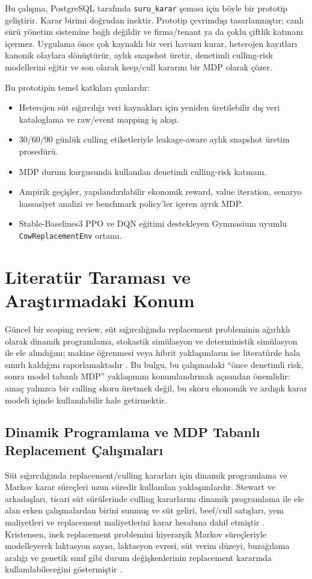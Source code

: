 \documentclass[conference]{IEEEtran}
\begin{document}
Bu çalışma, PostgreSQL tarafında \texttt{suru\_karar} şeması için böyle bir
prototip geliştirir. Karar birimi doğrudan inektir. Prototip çevrimdışı
tasarlanmıştır; canlı sürü yönetim sistemine bağlı değildir ve firma/tenant ya
da çoklu çiftlik katmanı içermez. Uygulama önce çok kaynaklı bir veri havuzu
kurar, heterojen kayıtları kanonik olaylara dönüştürür, aylık snapshot üretir,
denetimli culling-risk modellerini eğitir ve son olarak keep/cull kararını bir
MDP olarak çözer.

Bu prototipin temel katkıları şunlardır:
\begin{itemize}
    \item Heterojen süt sığırcılığı veri kaynakları için yeniden üretilebilir
    dış veri kataloglama ve raw/event mapping iş akışı.
    \item 30/60/90 günlük culling etiketleriyle leakage-aware aylık snapshot
    üretim prosedürü.
    \item MDP durum kurgusunda kullanılan denetimli culling-risk katmanı.
    \item Ampirik geçişler, yapılandırılabilir ekonomik reward, value iteration,
    senaryo hassasiyet analizi ve benchmark policy'ler içeren ayrık MDP.
    \item Stable-Baselines3 PPO ve DQN eğitimi destekleyen Gymnasium uyumlu
    \texttt{CowReplacementEnv} ortamı.
\end{itemize}

\section{Literatür Taraması ve Araştırmadaki Konum}
Güncel bir scoping review, süt sığırcılığında replacement probleminin ağırlıklı
olarak dinamik programlama, stokastik simülasyon ve deterministik simülasyon
ile ele alındığını; makine öğrenmesi veya hibrit yaklaşımların ise literatürde
hala sınırlı kaldığını raporlamaktadır \cite{palma2025}. Bu bulgu, bu
çalışmadaki ``önce denetimli risk, sonra model tabanlı MDP'' yaklaşımını
konumlandırmak açısından önemlidir: amaç yalnızca bir culling skoru üretmek
değil, bu skoru ekonomik ve ardışık karar modeli içinde kullanılabilir hale
getirmektir.

\subsection{Dinamik Programlama ve MDP Tabanlı Replacement Çalışmaları}
Süt sığırcılığında replacement/culling kararları için dinamik programlama ve
Markov karar süreçleri uzun süredir kullanılan yaklaşımlardır. Stewart ve
arkadaşları, ticari süt sürülerinde culling kararlarını dinamik programlama ile
ele alan erken çalışmalardan birini sunmuş ve süt geliri, beef/cull satışları,
yem maliyetleri ve replacement maliyetlerini karar hesabına dahil etmiştir
\cite{stewart1977}. Kristensen, inek replacement problemini hiyerarşik Markov
süreçleriyle modelleyerek laktasyon sayısı, laktasyon evresi, süt verim düzeyi,
buzağılama aralığı ve genetik sınıf gibi durum değişkenlerinin replacement
kararında kullanılabileceğini göstermiştir \cite{kristensen1987}.
\end{document}
